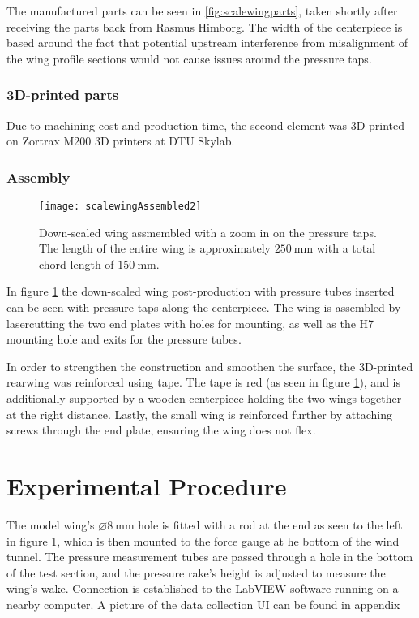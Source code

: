       The manufactured parts can be seen in \ref{fig:scalewingparts}, taken shortly after receiving the parts back from Rasmus Himborg. The width of the centerpiece is based around the fact that potential upstream interference from misalignment of the wing profile sections would not cause issues around the pressure taps.

      \subsubsection{3D-printed parts}

        Due to machining cost and production time, the second element was 3D-printed on Zortrax M200 3D printers at DTU Skylab.

      \subsubsection{Assembly}

      \begin{figure}
        \texttt{[image: scalewingAssembled2]}
        \caption{Down-scaled wing assmembled with a zoom in on the pressure taps. The length of the entire wing is approximately $\SI{250}{\milli\metre}$ with a total chord length of $\SI{150}{\milli\metre}$.}
        \label{fig:scalewing}
      \end{figure}

      In figure \ref{fig:scalewing} the down-scaled wing post-production with pressure tubes inserted can be seen with pressure-taps along the centerpiece. The wing is assembled by lasercutting the two end plates with holes for mounting, as well as the H7 mounting hole and exits for the pressure tubes.

      In order to strengthen the construction and smoothen the surface, the 3D-printed rearwing was reinforced using tape. The tape is red (as seen in figure \ref{fig:scalewing}), and is additionally supported by a wooden centerpiece holding the two wings together at the right distance. Lastly, the small wing is reinforced further by attaching screws through the end plate, ensuring the wing does not flex.

\section{Experimental Procedure}

  The model wing's $\diameter\SI{8}{\milli\metre}$ hole is fitted with a rod at the end as seen to the left in figure \ref{fig:scalewing}, which is then mounted to the force gauge at he bottom of the wind tunnel. The pressure measurement tubes are passed through a hole in the bottom of the test section, and the pressure rake's height is adjusted to measure the wing's wake. Connection is established to the LabVIEW software running on a nearby computer. A picture of the data collection UI can be found in appendix %

